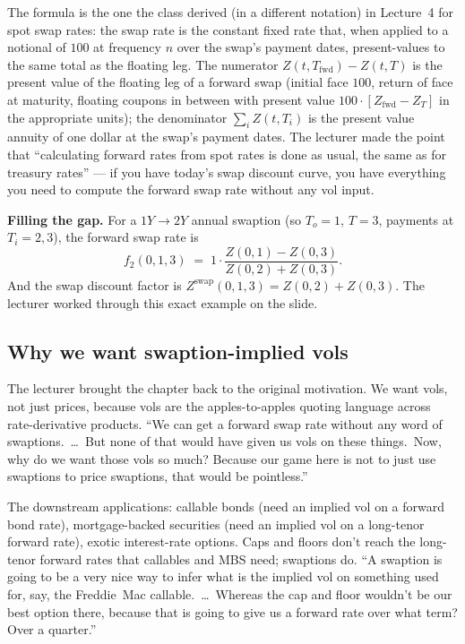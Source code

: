 The formula is the one the class derived (in a different notation) in
Lecture~4 for spot swap rates: the swap rate is the constant fixed
rate that, when applied to a notional of $100$ at frequency $n$ over
the swap's payment dates, present-values to the same total as the
floating leg. The numerator
$Z(t, T_{\text{fwd}}) - Z(t, T)$ is the present value of the floating
leg of a forward swap (initial face $100$, return of face at maturity,
floating coupons in between with present value $100 \cdot [Z_{\text{fwd}}
- Z_T]$ in the appropriate units); the denominator
$\sum_i Z(t, T_i)$ is the present value annuity of one dollar at the
swap's payment dates.
The lecturer made the point that ``calculating forward rates from
spot rates is done as usual, the same as for treasury rates'' --- if
you have today's swap discount curve, you have everything you need to
compute the forward swap rate without any vol input.

\begin{tipblock}
\textbf{Filling the gap.} For a $1Y \to 2Y$ annual swaption (so
$T_o = 1$, $T = 3$, payments at $T_i = 2, 3$), the forward swap rate
is
\[
  f_2(0, 1, 3) \;=\; 1 \cdot \frac{Z(0, 1) - Z(0, 3)}{Z(0, 2) + Z(0, 3)}.
\]
And the swap discount factor is $Z^{\text{swap}}(0, 1, 3)
= Z(0, 2) + Z(0, 3)$. The lecturer worked through this exact example
on the slide.
\end{tipblock}

\subsection{Why we want swaption-implied vols}\label{L6-sec:why-swaption-vol}

The lecturer brought the chapter back to the original motivation. We
want vols, not just prices, because vols are the apples-to-apples
quoting language across rate-derivative products. ``We can get a
forward swap rate without any word of swaptions.\ \ldots\ But none of
that would have given us vols on these things.\ Now, why do we want
those vols so much? Because our game here is not to just use
swaptions to price swaptions, that would be pointless.''

The downstream applications: callable bonds (need an implied vol on a
forward bond rate), mortgage-backed securities (need an implied vol
on a long-tenor forward rate), exotic interest-rate options. Caps and
floors don't reach the long-tenor forward rates that callables and
MBS need; swaptions do. ``A swaption is going to be a very nice way
to infer what is the implied vol on something used for, say, the
Freddie~Mac callable.\ \ldots\ Whereas the cap and floor wouldn't be
our best option there, because that is going to give us a forward
rate over what term? Over a quarter.''

